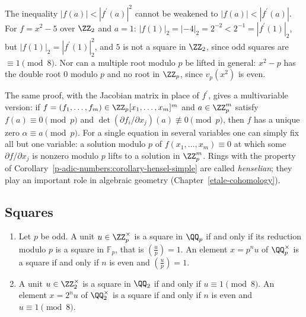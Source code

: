 \begin{counterexample}\label{p-adic-numbers:counterexample-hensel}
The inequality $|f(a)| < |f^{\prime}(a)|^2$ cannot be weakened to $|f(a)| < |f^{\prime}(a)|$. For $f = x^2 - 5$ over $\ZZ_2$ and $a = 1$: $|f(1)|_2 = |{-4}|_2 = 2^{-2} < 2^{-1} = |f^{\prime}(1)|_2$, but
$|f(1)|_2 = |f^{\prime}(1)|_2^2$, and $5$ is not a square in $\ZZ_2$, since odd squares are $\equiv 1 \pmod 8$. Nor can a multiple root modulo $p$ be lifted in general: $x^2 - p$ has the double root $0$
modulo $p$ and no root in $\ZZ_p$, since $v_p(x^2)$ is even.
\end{counterexample}

\begin{remark}\label{p-adic-numbers:remark-hensel-several}
The same proof, with the Jacobian matrix in place of $f^{\prime}$, gives a multivariable version: if $f = (f_1, \ldots, f_m) \in \ZZ_p[x_1, \ldots, x_m]^m$ and $a \in \ZZ_p^m$ satisfy
$f(a) \equiv 0 \pmod p$ and $\det(\partial f_i/\partial x_j)(a) \not\equiv 0 \pmod p$, then $f$ has a unique zero $\alpha \equiv a \pmod p$. For a single equation in several variables one can simply fix all
but one variable: a solution modulo $p$ of $f(x_1, \ldots, x_m) \equiv 0$ at which some $\partial f/\partial x_j$ is nonzero modulo $p$ lifts to a solution in $\ZZ_p^m$. Rings with the property of
Corollary~\ref{p-adic-numbers:corollary-hensel-simple} are called \emph{henselian}; they play an important role in algebraic geometry (Chapter~\ref{etale-cohomology}).
\end{remark}

\subsection{Squares}\label{p-adic-numbers:subsection-squares}

\begin{theorem}\label{p-adic-numbers:theorem-squares}
\begin{enumerate}
\item Let $p$ be odd. A unit $u \in \ZZ_p^\times$ is a square in $\QQ_p$ if and only if its reduction modulo $p$ is a square in $\mathbb{F}_p$, that is $(\frac up) = 1$. An element $x = p^nu$ of $\QQ_p^\times$
is a square if and only if $n$ is even and $(\frac up) = 1$.
\item A unit $u \in \ZZ_2^\times$ is a square in $\QQ_2$ if and only if $u \equiv 1 \pmod 8$. An element $x = 2^nu$ of $\QQ_2^\times$ is a square if and only if $n$ is even and $u \equiv 1 \pmod 8$.
\end{enumerate}
\end{theorem}

